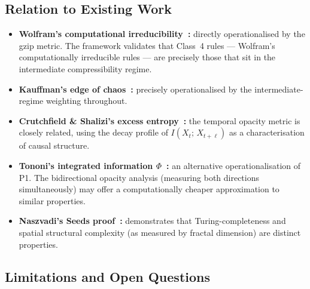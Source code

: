 \documentclass[12pt,a4paper]{article}
\begin{document}
\subsection{Relation to Existing Work}

\begin{itemize}[noitemsep]
  \item \textbf{Wolfram's computational irreducibility~\cite{wolfram2002}:}
    directly operationalised by the gzip metric.
    The framework validates that Class~4 rules --- Wolfram's
    computationally irreducible rules --- are precisely those that sit
    in the intermediate compressibility regime.

  \item \textbf{Kauffman's edge of chaos~\cite{kauffman1993,langton1990}:}
    precisely operationalised by the intermediate-regime weighting
    throughout.

  \item \textbf{Crutchfield \& Shalizi's excess entropy~\cite{crutchfield2001}:}
    the temporal opacity metric is closely related, using the decay
    profile of $I(X_t;\,X_{t+\ell})$ as a characterisation of causal
    structure.

  \item \textbf{Tononi's integrated information $\Phi$~\cite{tononi2004}:}
    an alternative operationalisation of P1.
    The bidirectional opacity analysis (measuring both directions
    simultaneously) may offer a computationally cheaper approximation
    to similar properties.

  \item \textbf{Naszvadi's Seeds proof~\cite{naszvadi2020}:}
    demonstrates that Turing-completeness and spatial structural
    complexity (as measured by fractal dimension) are distinct
    properties.
\end{itemize}

\subsection{Limitations and Open Questions}
\end{document}
